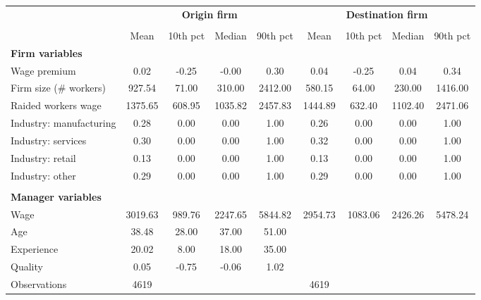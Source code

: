 {
\def\sym#1{\ifmmode^{#1}\else\(^{#1}\)\fi}
\begin{tabular}{l*{2}{cccc}}
\toprule
                    &\multicolumn{4}{c}{\textbf{Origin firm}}           &\multicolumn{4}{c}{\textbf{Destination firm}}      \\\cmidrule(lr){2-5}\cmidrule(lr){6-9}
                    &\multicolumn{4}{c}{}                               &\multicolumn{4}{c}{}                               \\
                    &        Mean&    10th pct&      Median&    90th pct&        Mean&    10th pct&      Median&    90th pct\\
\midrule
\textbf{Firm variables}&            &            &            &            &            &            &            &            \\
Wage premium        &        0.02&       -0.25&       -0.00&        0.30&        0.04&       -0.25&        0.04&        0.34\\
Firm size (\# workers)&      927.54&       71.00&      310.00&     2412.00&      580.15&       64.00&      230.00&     1416.00\\
Raided workers wage &     1375.65&      608.95&     1035.82&     2457.83&     1444.89&      632.40&     1102.40&     2471.06\\
Industry: manufacturing&        0.28&        0.00&        0.00&        1.00&        0.26&        0.00&        0.00&        1.00\\
Industry: services  &        0.30&        0.00&        0.00&        1.00&        0.32&        0.00&        0.00&        1.00\\
Industry: retail    &        0.13&        0.00&        0.00&        1.00&        0.13&        0.00&        0.00&        1.00\\
Industry: other     &        0.29&        0.00&        0.00&        1.00&        0.29&        0.00&        0.00&        1.00\\
\\ \textbf{Manager variables}&            &            &            &            &            &            &            &            \\
Wage                &     3019.63&      989.76&     2247.65&     5844.82&     2954.73&     1083.06&     2426.26&     5478.24\\
Age                 &       38.48&       28.00&       37.00&       51.00&            &            &            &            \\
Experience          &       20.02&        8.00&       18.00&       35.00&            &            &            &            \\
Quality             &        0.05&       -0.75&       -0.06&        1.02&            &            &            &            \\
\midrule
Observations        &        4619&            &            &            &        4619&            &            &            \\
\bottomrule
\end{tabular}
}
